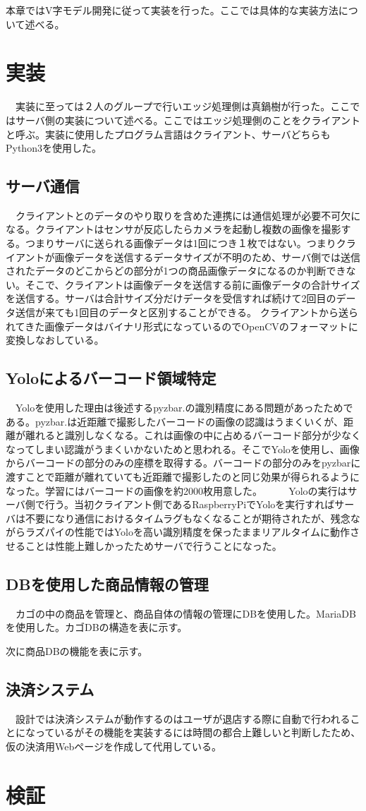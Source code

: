 本章ではV字モデル開発に従って実装を行った。ここでは具体的な実装方法について述べる。
\section{実装}
　実装に至っては２人のグループで行いエッジ処理側は真鍋樹が行った。ここではサーバ側の実装について述べる。ここではエッジ処理側のことをクライアントと呼ぶ。実装に使用したプログラム言語はクライアント、サーバどちらもPython3を使用した。

\subsection*{サーバ通信}
　クライアントとのデータのやり取りを含めた連携には通信処理が必要不可欠になる。クライアントはセンサが反応したらカメラを起動し複数の画像を撮影する。つまりサーバに送られる画像データは1回につき１枚ではない。つまりクライアントが画像データを送信するデータサイズが不明のため、サーバ側では送信されたデータのどこからどの部分が1つの商品画像データになるのか判断できない。そこで、クライアントは画像データを送信する前に画像データの合計サイズを送信する。サーバは合計サイズ分だけデータを受信すれば続けて2回目のデータ送信が来ても1回目のデータと区別することができる。
クライアントから送られてきた画像データはバイナリ形式になっているのでOpenCVのフォーマットに変換しなおしている。

\subsection*{Yoloによるバーコード領域特定}
　Yoloを使用した理由は後述するpyzbar\cite{pyzbar}.の識別精度にある問題があったためである。pyzbar\cite{pyzbar}.は近距離で撮影したバーコードの画像の認識はうまくいくが、距離が離れると識別しなくなる。これは画像の中に占めるバーコード部分が少なくなってしまい認識がうまくいかないためと思われる。そこでYoloを使用し、画像からバーコードの部分のみの座標を取得する。バーコードの部分のみをpyzbarに渡すことで距離が離れていても近距離で撮影したのと同じ効果が得られるようになった。学習にはバーコードの画像を約2000枚用意した。
　
　Yoloの実行はサーバ側で行う。当初クライアント側であるRaspberryPiでYoloを実行すればサーバは不要になり通信におけるタイムラグもなくなることが期待されたが、残念ながらラズパイの性能ではYoloを高い識別精度を保ったままリアルタイムに動作させることは性能上難しかったためサーバで行うことになった。

\subsection*{DBを使用した商品情報の管理}
　カゴの中の商品を管理と、商品自体の情報の管理にDBを使用した。MariaDBを使用した。カゴDBの構造を表に示す。


次に商品DBの機能を表に示す。


\subsection*{決済システム}
　設計では決済システムが動作するのはユーザが退店する際に自動で行われることになっているがその機能を実装するには時間の都合上難しいと判断したため、仮の決済用Webページを作成して代用している。

\section{検証}